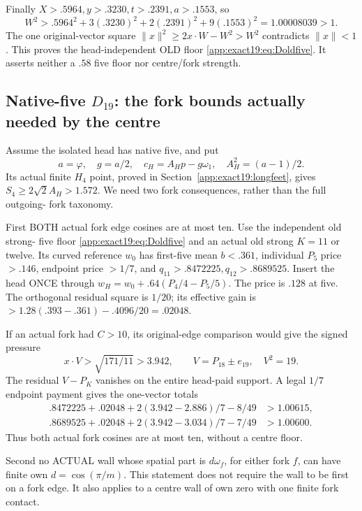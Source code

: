 \documentclass[11pt]{article}
\theoremstyle{definition}
\theoremstyle{remark}
\begin{document}
Finally
\(X>.5964,y>.3230,t>.2391,a>.1553\),
so
\[
 W^2>.5964^2+3(.3230)^2+2(.2391)^2+9(.1553)^2
                                 =1.00008039>1 .
\]
The one original-vector square
\(\|x\|^2\ge2x\cdot W-W^2>W^2\)
contradicts \(\|x\|<1\).
This proves the head-independent
OLD floor \eqref{app:exact19:eq:Doldfive}.
It asserts neither a \(.58\)
five floor nor centre/fork strength.


\subsection[Native-five D19: the fork bounds actually needed by the centre]{Native-five \(D_{19}\): the fork bounds actually needed by the centre}
\label{app:exact19:Dfiveforkinputs}

Assume the isolated head has
native five, and put
\[
 a=\varphi,\quad g=a/2,\quad
 c_H=A_Hp-g\omega_1,\quad A_H^2=(a-1)/2 .
\]
Its actual finite \(H_4\) point,
proved in
Section~\ref{app:exact19:longfeet},
gives \(S_4\ge2\sqrt2A_H>1.572\).
We need two fork consequences,
rather than the full outgoing-
fork taxonomy.

First BOTH actual fork edge
cosines are at most ten.
Use the independent old strong-
five floor
\eqref{app:exact19:eq:Doldfive}
and an actual old strong
\(K=11\) or twelve.
Its curved reference \(w_0\)
has first-five mean \(b<.361\),
individual \(P_5\) price \(>.146\),
endpoint price \(>1/7\), and
\(q_{11}>.8472225,q_{12}>.8689525\).
Insert the head ONCE through
\(w_H=w_0+.64(P_4/4-P_5/5)\).
The price is \(.128\) at five.
The orthogonal residual square
is \(1/20\); its effective gain
is \(>1.28(.393-.361)-.4096/20=.02048\).

If an actual fork had \(C>10\),
its original-edge comparison would
give the signed pressure
\[
 x\cdot V>\sqrt{171/11}>3.942,\qquad
              V=P_{18}\pm e_{19},\quad V^2=19 .
\]
The residual \(V-P_K\) vanishes
on the entire head-paid support.
A legal \(1/7\) endpoint payment
gives the one-vector totals
\[
\begin{split}
 .8472225+.02048+2(3.942-2.886)/7-8/49&>1.00615,\\
 .8689525+.02048+2(3.942-3.034)/7-7/49&>1.00600 .
\end{split}
\]
Thus both actual fork cosines
are at most ten, without a
centre floor.

Second no ACTUAL wall whose
spatial part is \(d\omega_f\),
for either fork \(f\), can have
finite own \(d=\cos(\pi/m)\).
This statement does not require
the wall to be first on a fork
edge.
It also applies to a centre
wall of own zero with one
finite fork contact.
\end{document}

